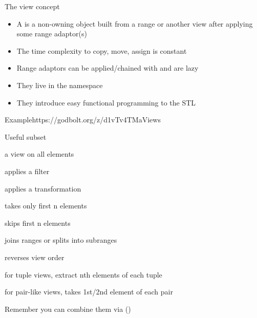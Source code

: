 \begin{frame}[fragile]
  \begin{block}{The view concept}
    \begin{itemize}
    \item A  is a non-owning object built from a range or another view after applying some range adaptor(s)
    \item The time complexity to copy, move, assign is constant
    \item Range adaptors can be applied/chained with \cppinline{|} and are lazy
    \item They live in the  namespace
    \item They introduce easy functional programming to the STL
    \end{itemize}
  \end{block}
  \begin{exampleblockGB}{Example}{https://godbolt.org/z/d1vTv4TMa}{Views}
    { \small
    }
  \end{exampleblockGB}
\end{frame}

\begin{frame}[fragile]
  \begin{block}{Useful subset}
    \begin{description}
    \item[all] a view on all elements
    \item[filter] applies a filter
    \item[transform] applies a transformation
    \item[take] takes only first n elements
    \item[drop] skips first n elements
    \item[join/split] joins ranges or splits into subranges
    \item[reverse] reverses view order
    \item[elements] for tuple views, extract nth elements of each tuple
    \item[keys/values] for pair-like views, takes 1st/2nd element of each pair
    \end{description}
  \end{block}
  Remember you can combine them via (\cppinline{|})
\end{frame}

